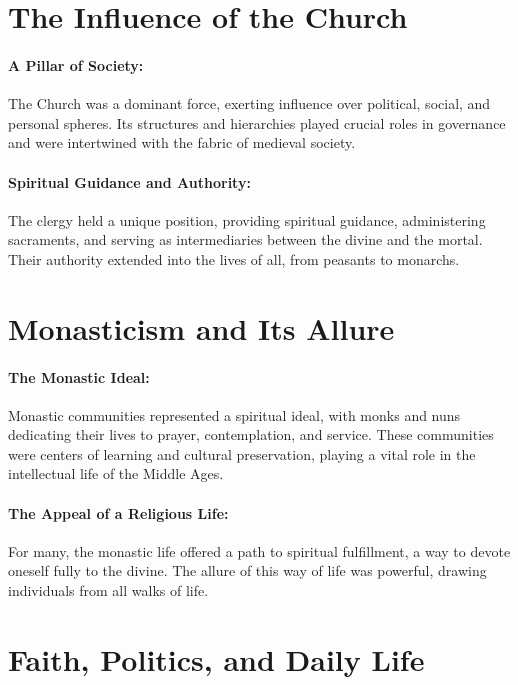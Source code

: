 \documentclass{book}
\begin{document}
\section*{The Influence of the Church}

\paragraph{A Pillar of Society:}
The Church was a dominant force, exerting influence over political, social, and personal spheres. Its structures and hierarchies played crucial roles in governance and were intertwined with the fabric of medieval society.

\paragraph{Spiritual Guidance and Authority:}
The clergy held a unique position, providing spiritual guidance, administering sacraments, and serving as intermediaries between the divine and the mortal. Their authority extended into the lives of all, from peasants to monarchs.

\section*{Monasticism and Its Allure}

\paragraph{The Monastic Ideal:}
Monastic communities represented a spiritual ideal, with monks and nuns dedicating their lives to prayer, contemplation, and service. These communities were centers of learning and cultural preservation, playing a vital role in the intellectual life of the Middle Ages.

\paragraph{The Appeal of a Religious Life:}
For many, the monastic life offered a path to spiritual fulfillment, a way to devote oneself fully to the divine. The allure of this way of life was powerful, drawing individuals from all walks of life.

\section*{Faith, Politics, and Daily Life}
\end{document}

